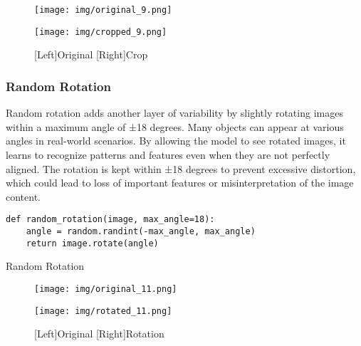 \documentclass[a4paper,11pt]{article}
\begin{document}
\begin{figure}[ht]
    \centering
    \begin{minipage}{0.49\textwidth}
        \texttt{[image: img/original\_9.png]}
    \end{minipage}
    \hfill
    \begin{minipage}{0.49\textwidth}
        \texttt{[image: img/cropped\_9.png]}
    \end{minipage}
    \caption{[Left]Original [Right]Crop}
\end{figure}

\subsubsection{Random Rotation}
Random rotation adds another layer of variability by slightly rotating images within a maximum angle of ±18 degrees. Many objects can appear at various angles in real-world scenarios. By allowing the model to see rotated images, it learns to recognize patterns and features even when they are not perfectly aligned. The rotation is kept within ±18 degrees to prevent excessive distortion, which could lead to loss of important features or misinterpretation of the image content.

\begin{listing}[!ht]
\begin{verbatim}
def random_rotation(image, max_angle=18):
    angle = random.randint(-max_angle, max_angle)
    return image.rotate(angle)
\end{verbatim}
\caption{Random Rotation}
\label{listing:python}
\end{listing}

\begin{figure}[ht]
    \centering
    \begin{minipage}{0.49\textwidth}
        \texttt{[image: img/original\_11.png]}
    \end{minipage}
    \hfill
    \begin{minipage}{0.49\textwidth}
        \texttt{[image: img/rotated\_11.png]}
    \end{minipage}
    \caption{[Left]Original [Right]Rotation}
\end{figure}
\end{document}
